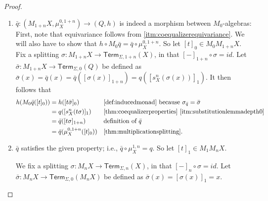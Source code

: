 \documentclass[11pt,a4paper]{amsart}
\newcommand{\Term}{\mathsf{Term}}
\newcommand{\sig}{\Sigma}
\newcommand{\supp}{\mathsf{supp}}
\theoremstyle{plain}
\newcommand{\id}{\mathit{id}}
\numberwithin{equation}{section}
\newcommand{\+}[1]{\mathcal{#1}\xspace}
\theoremstyle{definition}
\begin{document}
\begin{proof}
\begin{enumerate}[wide]
\begin{itemize}
                    If \(d(f) = 1\), we have
                    \begin{align*}
                        \bar{q}([t]_{1 + n}) &= \bar{q}([\nu a.f([t_1]_{n}, \ldots, [t_p]_{n})]_1) \quad \text{and} \\
                        \bar{q}([u]_{1 + n}) &= \bar{q}([\nu b.f([u_1]_{n}, \ldots, [u_p]_{n})]_1)
                    \end{align*}
                    analogously to (cong$_f$).
                    Furthermore, for \(i \in \{1, \ldots, p\}\), we have \([t_i]_n = [(a\ b)u_i]_n = (a\ b)[u_i]_n\) and \(a \notin \supp([u_i]_n) \subseteq \supp(u_i)\) by assumption.
                    The result then follows by (perm).
            \end{itemize}
        \item \label{itm:coequalizermorphism}
            \(\bar{q}: (M_{1 + n} X, \mu^{0, 1 + n}_X) \to (Q, h)\) is indeed a morphism between \(M_0\)-algebras:
            First, note that equivariance follows from \eqref{itm:coequalizerequivariance}.
            We will also have to show that \(h \circ M_0 \bar{q} = \bar{q} \circ \mu^{0, 1 + n}_X\).
            So let \([t]_0 \in M_0 M_{1 + n} X\).
            Fix a splitting \(\sigma: M_{1 + n} X \to \Term_{\sig, 1 + n}(X)\), in that \([-]_{1 + n} \circ \sigma = \id\).
            Let \(\bar{\sigma}: M_{1 + n} X \to \Term_{\sig, 0}(Q)\) be defined as \(\bar{\sigma}(x) = \bar{q}(x) = \bar{q}([\sigma(x)]_{1 + n}) = q([s^n_X(\sigma(x))]_1)\).
            It then follows that
            \begin{align*}
                h(M_0 \bar{q}([t]_0))
                &= h([t\bar{\sigma}]_0) && \text{\cref{def:inducedmonad} because } \sigma_{\bar{q}} = \bar{\sigma} \\
                &= q([s^n_X(t\sigma)]_1) && \text{\cref{thm:coequalizerproperties} \eqref{itm:substitutionlemmadepth0}} \\
                &= \bar{q}([t\sigma]_{1 + n}) && \text{definition of } \bar{q} \\
                &= \bar{q}(\mu^{0, 1 + n}_X([t]_0)) && \text{\cref{thm:multiplicationsplitting}}.
            \end{align*}
        \item \label{itm:coequalizercorrect}
            \(\bar{q}\) satisfies the given property; i.e., \(\bar{q} \circ \mu^{1, n}_X = q\).
            So let \([t]_1 \in M_1 M_n X\).

            We fix a splitting \(\sigma: M_n X \to \Term_{\sig, n}(X)\), in that \([-]_n \circ \sigma = \id\).
            Let \(\bar{\sigma}: M_n X \to \Term_{\sig, 0}(M_n X)\) be defined as \(\bar{\sigma}(x) = [\sigma(x)]_1 = x\).


\end{enumerate}
\end{proof}
\end{document}

